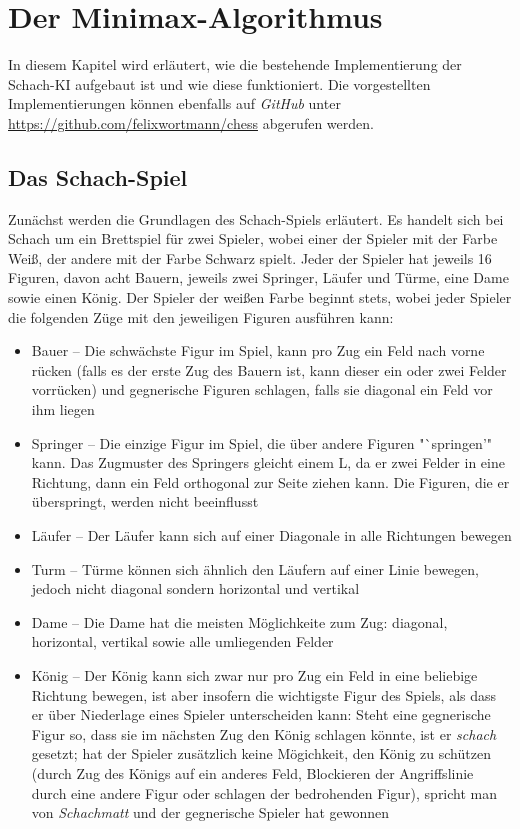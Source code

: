 
\chapter{Der Minimax-Algorithmus}
In diesem Kapitel wird erläutert, wie die bestehende Implementierung der Schach-KI aufgebaut ist und wie diese funktioniert. Die vorgestellten Implementierungen können ebenfalls auf \textit{GitHub} unter \url{https://github.com/felixwortmann/chess} abgerufen werden.

\section{Das Schach-Spiel}
Zunächst werden die Grundlagen des Schach-Spiels erläutert. Es handelt sich bei Schach um ein Brettspiel für zwei Spieler, wobei einer der Spieler mit der Farbe Weiß, der andere mit der Farbe Schwarz spielt. Jeder der Spieler hat jeweils 16 Figuren, davon acht Bauern, jeweils zwei Springer, Läufer und Türme, eine Dame sowie einen König. Der Spieler der weißen Farbe beginnt stets, wobei jeder Spieler die folgenden Züge mit den jeweiligen Figuren ausführen kann:

\begin{itemize}
    \item Bauer -- Die schwächste Figur im Spiel, kann pro Zug ein Feld nach vorne rücken (falls es der erste Zug des Bauern ist, kann dieser ein oder zwei Felder vorrücken) und gegnerische Figuren schlagen, falls sie diagonal ein Feld vor ihm liegen
    \item Springer -- Die einzige Figur im Spiel, die über andere Figuren "`springen'" kann. Das Zugmuster des Springers gleicht einem L, da er zwei Felder in eine Richtung, dann ein Feld orthogonal zur Seite ziehen kann. Die Figuren, die er überspringt, werden nicht beeinflusst
    \item Läufer -- Der Läufer kann sich auf einer Diagonale in alle Richtungen bewegen
    \item Turm -- Türme können sich ähnlich den Läufern auf einer Linie bewegen, jedoch nicht diagonal sondern horizontal und vertikal
    \item Dame -- Die Dame hat die meisten Möglichkeite zum Zug: diagonal, horizontal, vertikal sowie alle umliegenden Felder
    \item König -- Der König kann sich zwar nur pro Zug ein Feld in eine beliebige Richtung bewegen, ist aber insofern die wichtigste Figur des Spiels, als dass er über Niederlage eines Spieler unterscheiden kann: Steht eine gegnerische Figur so, dass sie im nächsten Zug den König schlagen könnte, ist er \textit{schach} gesetzt; hat der Spieler zusätzlich keine Mögichkeit, den König zu schützen (durch Zug des Königs auf ein anderes Feld, Blockieren der Angriffslinie durch eine andere Figur oder schlagen der bedrohenden Figur), spricht man von \textit{Schachmatt} und der gegnerische Spieler hat gewonnen
\end{itemize}


